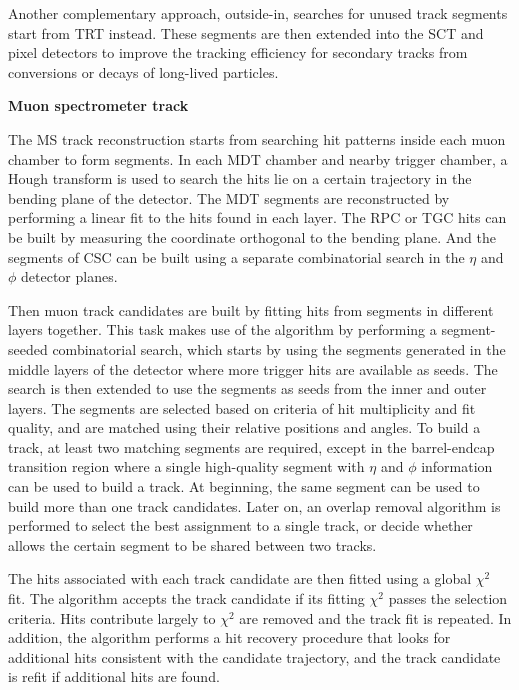 Another complementary approach, outside-in, searches for unused track segments start from TRT instead.
These segments are then extended into the SCT and pixel detectors to improve the tracking efficiency for secondary tracks from conversions or decays of long-lived particles.

\textbf{Muon spectrometer track}

The MS track reconstruction\cite{Aad:2016jkr} starts from searching hit patterns inside each muon chamber to form segments.
In each MDT chamber and nearby trigger chamber, a Hough transform\cite{ILLINGWORTH198887} is used to search the hits lie on a certain trajectory in the bending plane of the detector.
The MDT segments are reconstructed by performing a linear fit to the hits found in each layer.
The RPC or TGC hits can be built by measuring the coordinate orthogonal to the bending plane.
And the segments of CSC can be built using a separate combinatorial search in the $\eta$ and $\phi$ detector planes.

Then muon track candidates are built by fitting hits from segments in different layers together.
This task makes use of the algorithm by performing a segment-seeded combinatorial search, which starts by using the segments generated in the middle layers of the detector where more trigger hits are available as seeds.
The search is then extended to use the segments as seeds from the inner and outer layers.
The segments are selected based on criteria of hit multiplicity and fit quality, and are matched using their relative positions and angles.
To build a track, at least two matching segments are required, except in the barrel-endcap transition region where a single high-quality segment with $\eta$ and $\phi$ information can be used to build a track.
At beginning, the same segment can be used to build more than one track candidates.
Later on, an overlap removal algorithm is performed to select the best assignment to a single track, or decide whether allows the certain segment to be shared between two tracks.

The hits associated with each track candidate are then fitted using a global $\chi^{2}$ fit.
The algorithm accepts the track candidate if its fitting $\chi^{2}$ passes the selection criteria.
Hits contribute largely to $\chi^{2}$ are removed and the track fit is repeated.
In addition, the algorithm performs a hit recovery procedure that looks for additional hits consistent with the candidate trajectory, and the track candidate is refit if additional hits are found.

